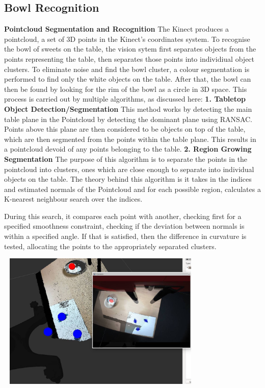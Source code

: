 \subsection{Bowl Recognition}
\textbf{Pointcloud Segmentation and Recognition}
\newline
The Kinect produces a pointcloud, a set of 3D points in the Kinect's coordinates system. To recognise the bowl of sweets on the table, the vision sytem first separates objects from the points representing the table, then separates those points into individiual object clusters. To eliminate noise and find the bowl cluster, a colour segmentation is performed to find only the white objects on the table. After that, the bowl can then be found by looking for the rim of the bowl as a circle in 3D space. This process is carried out by multiple algorithms, as discussed here:
\newline
\newline
\textbf{1. Tabletop Object Detection/Segmentation} 
\newline
This method works by detecting the main table plane in the Pointcloud by detecting the dominant plane using RANSAC. Points above this plane are then considered to be objects on top of the table, which are then segmented from the points within the table plane. This results in a pointcloud devoid of any points belonging to the table.
\newline
\newline
\textbf{2. Region Growing Segmentation}
\newline
The purpose of this algorithm is to separate the points in the pointcloud into clusters, ones which are close enough to separate into individual objects on the table. The theory behind this algorithm is it takes in the indices and estimated normals of the Pointcloud and for each possible region, calculates a K-nearest neighbour search over the indices. 
\begin{minipage}[t]{0.30\textwidth}
\raggedright
During this search, it compares each point with another, checking first for a specified smoothness constraint, checking if the deviation between normals is within a specified angle. If that is satisfied, then the difference in curvature is tested, allocating the points to the appropriately separated clusters.
\end{minipage}
\hspace{0.5cm}
\begin{minipage}[t]{0.64\textwidth}
\smallskip
\centering
\includegraphics[width = 10cm, height = 6.5cm]{sweettransformation.jpg}
\centering
{}
\bigskip
\bigskip
\end{minipage}
